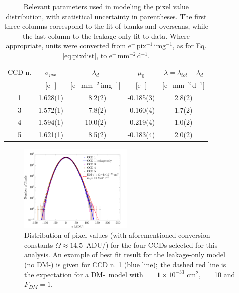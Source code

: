 \documentclass[aps,amsmath,amssymb,twocolumn,superscriptaddress,nofootinbib]{revtex4-1}
\begin{document}
\begin{table}[h!]
	\caption{\label{tab:fits} Relevant parameters used in modeling the pixel value distribution, with statistical uncertainty in parentheses. The first three columns correspond to the fit of blanks and overscans, while the last column to the leakage-only fit to data. Where appropriate, units were converted from e$^-$\,pix$^{-1}$\,img$^{-1}$, as for Eq. \ref{eq:pixdist}, to e$^-$\,mm$^{-2}$\,d$^{-1}$.}
	\begin{ruledtabular}
		\begin{tabular}{ccccc}
			CCD n.	& $\sigma_{pix}$			& $\lambda_{d}$	& $\mu_{0}$	&	$\lambda = \lambda_{tot}-\lambda_d$							\\
				& [e$^-$] 				&[e$^-$\,mm$^{-2}$\,img$^{-1}$]		& 	[e$^-$]	 & [e$^-$\,mm$^{-2}$\,d$^{-1}$]	\\				
				\hline
		1  &  1.628(1)  &  ~8.2(2)   &  -0.185(3)  & 2.8(2)  	\\
		3  &  1.572(1)  &  ~7.8(2)  &  -0.160(4)  &  1.7(2)  	\\
		4  &  1.594(1)  & 10.0(2)  &  -0.219(4)  & 1.0(2)  	\\
		5  &  1.621(1)  &  ~8.5(2)  &  -0.183(4)  & 2.0(2)  	\\
		\end{tabular}

	\end{ruledtabular}
\end{table}

\begin{figure}[!h]
	\centering
	\includegraphics[width=0.48\textwidth]{exthists.pdf}
	\caption{Distribution of pixel values (with aforementioned conversion constants $\Omega \approx 14.5$~ADU/\electron) for the four CCDs selected for this analysis. An example of best fit result for the leakage-only model (no DM-\electron) is given for CCD n. 1 (blue line); the dashed red line is the expectation for a DM-\electron\ model with \sige\ = $1 \times 10^{-33}$ cm$^2$, \mass\ = 10 \mevm and $F_{DM}=1$. %
	}
	\label{fig:exthists}
\end{figure}
\end{document}
